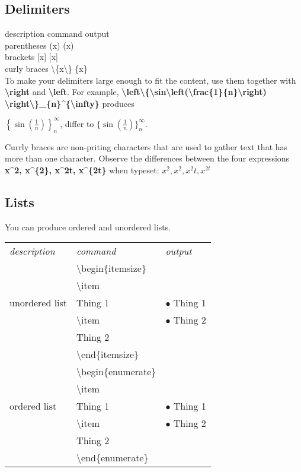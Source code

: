 \documentclass{article}
\begin{document}
\subsection{Delimiters}
description command output\\
parentheses (x) (x)\\
brackets [x] [x]\\
curly braces \textbackslash\{x\textbackslash\} \{x\}\\
To make your delimiters large enough to fit the content, use them together with \textbf{\textbackslash right} and \textbf{\textbackslash left}.
For example, \textbf{\textbackslash left\textbackslash\{\textbackslash sin\textbackslash left(\textbackslash frac\{1\}\{n\}\textbackslash right)
\textbackslash right\textbackslash\}\_\{n\}\textasciicircum\{\textbackslash infty\}} produces

$\left\{\sin\left(\frac{1}{n}\right)\right\}_{n}^{\infty}$, differ to 
$\{\sin(\frac{1}{n})\}_{n}^{\infty}$.

Currly braces are non-priting characters that are used to gather text that has more than one character.
Observe the differences between the four expressions \textbf{x\textasciicircum2, x\textasciicircum\{2\}, x\textasciicircum2t, x\textasciicircum\{2t\}}
when typeset: $x^2, x^{2}, x^2t, x^{2t}$

\subsection{Lists}
You can produce ordered and unordered lists.

\renewcommand{\arraystretch}{1.1}
\begin{table}[ht]
 \begin{tabular}{lll}
  \textit{description} &\textit{command} &\textit{output}\\
  \multirow{5}{*}{unordered list}
              &\textbackslash begin\{itemsize\}\\
              &\quad\textbackslash item\\
              &\quad Thing 1 &$\bullet$ Thing 1\\
              &\quad\textbackslash item &$\bullet$ Thing 2\\
              &\quad Thing 2 &\\
              &\textbackslash end\{itemsize\}&\vspace{1em}\\
  \multirow{5}{*}{ordered list}
              &\textbackslash begin\{enumerate\}\\
              &\quad\textbackslash item\\
              &\quad Thing 1 &$\bullet$ Thing 1\\
              &\quad\textbackslash item &$\bullet$ Thing 2\\
              &\quad Thing 2 &\\
              &\textbackslash end\{enumerate\}\\
 \end{tabular}
\end{table}
\end{document}

